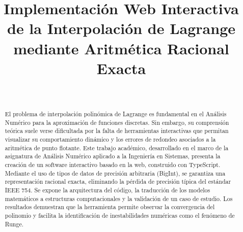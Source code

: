 \documentclass[conference]{IEEEtran}
\begin{document}
\title{Implementación Web Interactiva de la Interpolación de Lagrange mediante Aritmética Racional Exacta\\
}

\author{
\and
{}
\\[1cm]
\and
{}
}

\maketitle

\begin{abstract}
El problema de interpolación polinómica de Lagrange es fundamental en el Análisis Numérico para la aproximación de funciones discretas. Sin embargo, su comprensión teórica suele verse dificultada por la falta de herramientas interactivas que permitan visualizar su comportamiento dinámico y los errores de redondeo asociados a la aritmética de punto flotante. Este trabajo académico, desarrollado en el marco de la asignatura de Análisis Numérico aplicado a la Ingeniería en Sistemas, presenta la creación de un software interactivo basado en la web, construido con TypeScript. Mediante el uso de tipos de datos de precisión arbitraria (BigInt), se garantiza una representación racional exacta, eliminando la pérdida de precisión típica del estándar IEEE 754. Se expone la arquitectura del código, la traducción de los modelos matemáticos a estructuras computacionales y la validación de un caso de estudio. Los resultados demuestran que la herramienta permite observar la convergencia del polinomio y facilita la identificación de inestabilidades numéricas como el fenómeno de Runge.
\end{abstract}
\end{document}
